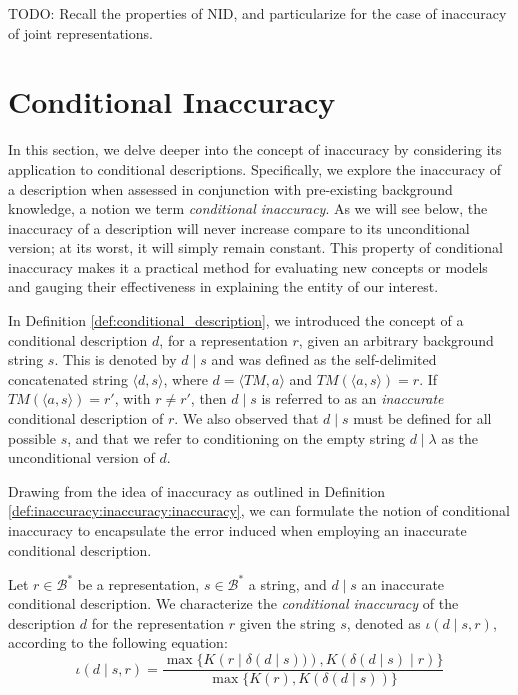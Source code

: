 {\color{red} TODO: Recall the properties of NID, and particularize for the case of inaccuracy of joint representations.}

%
%

\section{Conditional Inaccuracy}

In this section, we delve deeper into the concept of inaccuracy by considering its application to conditional descriptions. Specifically, we explore the inaccuracy of a description when assessed in conjunction with pre-existing background knowledge, a notion we term \emph{conditional inaccuracy}. As we will see below, the inaccuracy of a description will never increase compare to its unconditional version; at its worst, it will simply remain constant. This property of conditional inaccuracy makes it a practical method for evaluating new concepts or models and gauging their effectiveness in explaining the entity of our interest.

In Definition \ref{def:conditional_description}, we introduced the concept of a conditional description $d$, for a representation $r$, given an arbitrary background string $s$. This is denoted by $d \mid s$ and was defined as the self-delimited concatenated string $\langle d, s \rangle$, where $d = \langle TM, a \rangle$ and $TM \left(\langle a, s \rangle \right) = r$. If $TM \left(\langle a, s \rangle \right) = r'$, with $r \neq r'$, then $d \mid s$ is referred to as an \emph{inaccurate} conditional description of $r$. We also observed that $d \mid s$ must be defined for all possible $s$, and that we refer to conditioning on the empty string $d \mid \lambda$ as the unconditional version of $d$.

Drawing from the idea of inaccuracy as outlined in Definition \ref{def:inaccuracy:inaccuracy:inaccuracy}, we can formulate the notion of conditional inaccuracy to encapsulate the error induced when employing an inaccurate conditional description.

\begin{definition}
Let $r \in \mathcal{B}^\ast$ be a representation, $s \in \mathcal{B}^\ast$ a string, and $d \mid s$ an inaccurate conditional description. We characterize the \emph{conditional inaccuracy} of the description $d$ for the representation $r$ given the string $s$, denoted as $\iota(d \mid s, r)$, according to the following equation:
\[
\iota(d \mid s, r) = \frac{ \max\{ K \left(r \mid \delta(d \mid s) ) \right), K \left( \delta(d \mid s) \mid r \right) \} } { \max\{ K(r), K \left( \delta(d \mid s) \right) \} }
\]
\end{definition}

